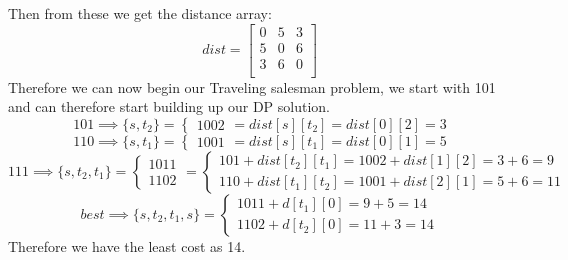 \documentclass[12pt]{article}
\begin{document}
Then from these we get the distance array:
\[
dist =
\begin{bmatrix}
0 & 5 & 3 \\
5 & 0 & 6 \\
3 & 6 & 0 \\
\end{bmatrix}
\]
Therefore we can now begin our Traveling salesman problem, we start with 101 and can therefore
start building up our DP solution.
\[
101 \implies \{s,t_2\} =
\begin{cases}
1002
\end{cases}
= dist[s][t_2] = dist[0][2] = 3
\]
\[
110 \implies \{s,t_1\} =
\begin{cases}
1001
\end{cases}
= dist[s][t_1] = dist[0][1] = 5
\]
\[
111 \implies \{s,t_2,t_1\} =
\begin{cases}
1011 \\
1102
\end{cases}
=
\begin{cases}
101 + dist[t_2][t_1] = 1002 + dist[1][2] = 3 + 6 = 9 \\
110 + dist[t_1][t_2] = 1001 + dist[2][1] = 5 + 6 = 11
\end{cases}
\]
\[
best \implies \{s,t_2,t_1,s\} =
\begin{cases}
1011 + d[t_1][0] = 9  + 5 = 14\\
1102 + d[t_2][0] = 11 + 3 = 14
\end{cases}
\]
Therefore we have the least cost as 14.



\end{document}
